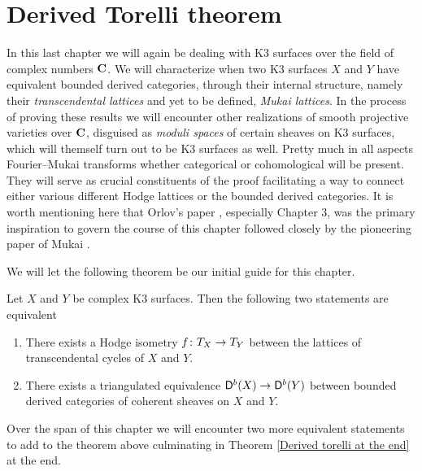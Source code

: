 \section{Derived Torelli theorem}
\label{Chapter: Derived Torelli theorem}

In this last chapter we will again be dealing with K3 surfaces over the field of complex numbers $\mathbf C$. We will characterize when two K3 surfaces $X$ and $Y$ have equivalent bounded derived categories, through their internal structure, namely their \emph{transcendental lattices} and yet to be defined, \emph{Mukai lattices}. In the process of proving these results we will encounter other realizations of smooth projective varieties over $\mathbf C$, disguised as \emph{moduli spaces} of certain sheaves on K3 surfaces, which will themself turn out to be K3 surfaces as well.
Pretty much in all aspects Fourier--Mukai transforms whether categorical or cohomological will be present. They will serve as crucial constituents of the proof facilitating a way to connect either various different Hodge lattices or the bounded derived categories. It is worth mentioning here that Orlov's paper \cite[]{Orlov2003}, especially Chapter 3, was the primary inspiration to govern the course of this chapter followed closely by the pioneering paper of Mukai \cite{Mukai1987}.

We will let the following theorem be our initial guide for this chapter.
\begin{theorem}
    \label{transc iso iff der equiv}
    Let $X$ and $Y$ be complex K3 surfaces. Then the following two statements are equivalent
    \begin{enumerate}[label = \roman*.]
        \item{There exists a Hodge isometry $f \colon T_{X} \to T_{Y}$ between the lattices of transcendental cycles of $X$ and $Y$.}
        \item{There exists a triangulated equivalence $\mathsf{D}^b(X) \to \mathsf{D}^b(Y)$ between bounded derived categories of coherent sheaves on $X$ and $Y$.} 
    \end{enumerate}
\end{theorem}
Over the span of this chapter we will encounter two more equivalent statements to add to the theorem above
culminating in Theorem \ref{Derived torelli at the end} at the end. 

